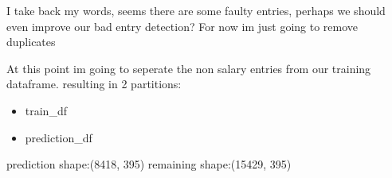 \documentclass[letterpaper,10pt,english]{jupyterBook}
\begin{document}
\sphinxAtStartPar
I take back my words, seems there are some faulty entries, perhaps we should even improve our bad entry detection? For now im just going to remove duplicates

\begin{sphinxVerbatim}[commandchars=\\\{\}]
  
\end{sphinxVerbatim}

\sphinxAtStartPar
At this point im going to seperate the non salary entries from our training dataframe. resulting in 2 partitions:
\begin{itemize}
\item {} 
\sphinxAtStartPar
train\_df

\item {} 
\sphinxAtStartPar
prediction\_df

\end{itemize}

\begin{sphinxVerbatim}[commandchars=\\\{\}]
  \PYG{p}{[}  \PYG{p}{]}
  
  
  
\end{sphinxVerbatim}

\begin{sphinxVerbatim}[commandchars=\\\{\}]
prediction shape:(8418, 395)
remaining shape:(15429, 395)
\end{sphinxVerbatim}
\end{document}
